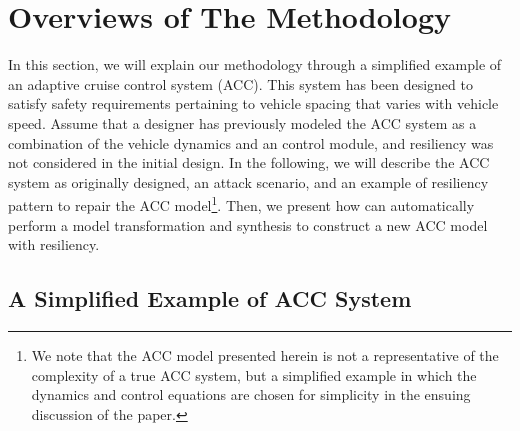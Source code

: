 \section{Overviews of The Methodology}
%
%
%
In this section, we will explain our methodology through a simplified example of an adaptive cruise control system (ACC). This system has been designed to satisfy safety requirements pertaining to vehicle spacing that varies with vehicle speed.
%
%
%
Assume that a designer has previously modeled the ACC system as a combination of the vehicle dynamics and an control module, and resiliency was not considered in the initial design. In the following, we will describe the ACC system as originally designed, an attack scenario, and an example of resiliency pattern to repair the ACC model\footnote{We note that the ACC model presented herein is not a representative of the complexity of a true ACC system, but a simplified example in which the dynamics and control equations are chosen for simplicity in the ensuing discussion of the paper.}.
%
Then, we present how \toolreaffirm can automatically perform a model transformation and synthesis to construct a new ACC model with resiliency. 
%
%

\subsection{A Simplified Example of ACC System}




